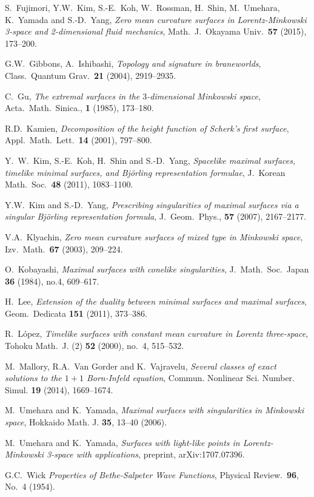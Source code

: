 \documentclass[12pt,amstex]{amsart}%
\theoremstyle{plain} %
\theoremstyle{definition}
\begin{document}
\begin{thebibliography}{99}
S.~Fujimori, Y.W.~Kim, S.-E.~Koh, W.~Rossman, H.~Shin, M.~Umehara, K.~Yamada and S.-D.~Yang, \emph{Zero mean curvature surfaces in Lorentz-Minkowski 3-space and 2-dimensional fluid mechanics}, Math.\ J.\ Okayama Univ.\ {\bf 57} (2015), 173--200.

G.W.\ Gibbons, A.\ Ishibashi, 
\emph{Topology and signature in braneworlds}, Class.\ Quantum Grav.\ {\bf 21} (2004), 2919--2935.


C.~Gu, \emph{The extremal surfaces in the $3$-dimensional Minkowski space}, Acta.\ Math.\ Sinica., {\bf 1} (1985), 173--180.


R.D.~Kamien, 
\emph{Decomposition of the height function of Scherk's first surface}, Appl.\ Math.\ Lett.\ {\bf 14} (2001), 797--800.

Y.~W.~Kim, S.-E.~Koh, H.~Shin and S.-D.~Yang,
\emph{Spacelike maximal surfaces, timelike minimal surfaces, and Bj\"orling representation formulae}, J.\ Korean Math.\ Soc.\ {\bf 48} (2011), 1083--1100.

Y.W.\ Kim and S.-D.\ Yang, 
\emph{Prescribing singularities of maximal surfaces via a singular Bj\"orling representation formula}, J.\ Geom.\ Phys., {\bf 57} (2007), 2167--2177.

V.A.\ Klyachin, \emph{Zero mean curvature surfaces of mixed type in Minkowski space}, Izv.\ Math.\ {\bf 67} (2003), 209--224.


O.\ Kobayashi, 
\emph{Maximal surfaces with conelike singularities}, J.\ Math.\ Soc.\ Japan {\bf 36} (1984), no.4, 609--617.

H.~Lee, \emph{Extension of the duality between minimal surfaces and maximal surfaces}, Geom.\ Dedicata {\bf 151} (2011), 373--386.

R.~L\'opez, \emph{Timelike surfaces with constant mean curvature in Lorentz three-space}, Tohoku Math.\ J. (2) {\bf 52} (2000), no.\ 4, 515--532.

M.~Mallory, R.A.~Van Gorder and K.~Vajravelu,
\emph{Several classes of exact solutions to the $1+1$ Born-Infeld equation}, Commun. Nonlinear Sci. Number. Simul. {\bf 19} (2014), 1669--1674.

M.~Umehara and K.~Yamada,
\emph{Maximal surfaces with singularities in Minkowski space}, Hokkaido Math. J. {\bf 35}, 13--40 (2006).

 M.\ Umehara and K.\ Yamada, 
\emph{Surfaces with light-like points in Lorentz-Minkowski 3-space with applications}, preprint, arXiv:1707.07396.

G.C.~Wick
\emph{Properties of Bethe-Salpeter Wave Functions}, Physical Review.\ {\bf 96}, No.\ 4 (1954).




\end{thebibliography}


 
\end{document}
